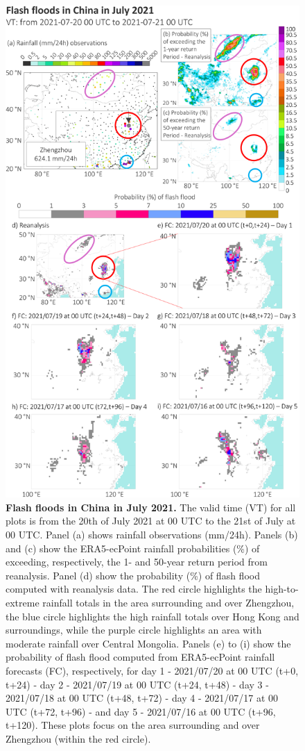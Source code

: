 \begin{figure}[htbp]
\centering
\includegraphics[scale = 0.9]{case_study_china.png}
\caption{\textbf{Flash floods in China in July 2021.} The valid time (VT) for all plots is from the 20th of July 2021 at 00 UTC to the 21st of July at 00 UTC. Panel (a) shows rainfall observations (mm/24h). Panels (b) and (c) show the ERA5-ecPoint rainfall probabilities (\%) of exceeding, respectively, the 1- and 50-year return period from reanalysis. Panel (d) show the probability (\%) of flash flood computed with reanalysis data. The red circle highlights the high-to-extreme rainfall totals in the area surrounding and over Zhengzhou, the blue circle highlights the high rainfall totals over Hong Kong and surroundings, while the purple circle highlights an area with moderate rainfall over Central Mongolia. Panels (e) to (i) show the probability of flash flood computed from ERA5-ecPoint rainfall forecasts (FC), respectively, for day 1 - 2021/07/20 at 00 UTC (t+0, t+24) - day 2 - 2021/07/19 at 00 UTC (t+24, t+48) - day 3 - 2021/07/18 at 00 UTC (t+48, t+72) - day 4 - 2021/07/17 at 00 UTC (t+72, t+96) - and day 5 - 2021/07/16 at 00 UTC (t+96, t+120). These plots focus on the area surrounding and over Zhengzhou (within the red circle).}
\label{fig:case_study_china}
\end{figure}

